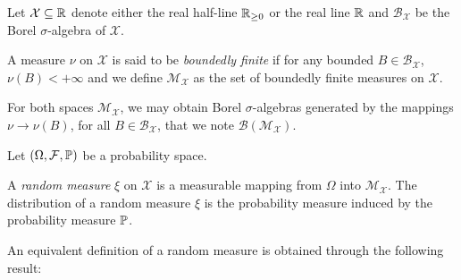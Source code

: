 Let $\mathcal{X} \subseteq {\mathbb R}$ denote either the real half-line ${\mathbb R}_{\geq 0}$ or the real line ${\mathbb R}$ and $\mathcal{B}_{\mathcal{X}}$ be the Borel $\sigma$-algebra of $\mathcal{X}$.

\begin{definition}
    A measure $\nu$ on $\mathcal{X}$ is said to be \emph{boundedly finite} if for any bounded $B\in\mathcal{B}_{\mathcal{X}}$, $\nu(B) < +\infty$ and we define $\mathcal{M}_{\mathcal{X}}$ as the set of boundedly finite measures on $\mathcal{X}$.
\end{definition}

For both spaces $\mathcal{M}_{\mathcal{X}}$, we may obtain Borel $\sigma$-algebras generated by the mappings $\nu \to \nu(B)$, for all $B\in\mathcal{B}_{\mathcal{X}}$, that we note $\mathcal{B}(\mathcal{M}_{\mathcal{X}})$.

Let $(\Omega, \mathcal{F}, {\mathbb P})$ be a probability space.

\begin{definition}
    A \emph{random measure} $\xi$ on $\mathcal{X}$ is a measurable mapping from $\Omega$ into $\mathcal{M}_{\mathcal{X}}$.
    The distribution of a random measure $\xi$ is the probability measure induced by the probability measure ${\mathbb P}$.
\end{definition}

An equivalent definition of a random measure is obtained through the following result:

